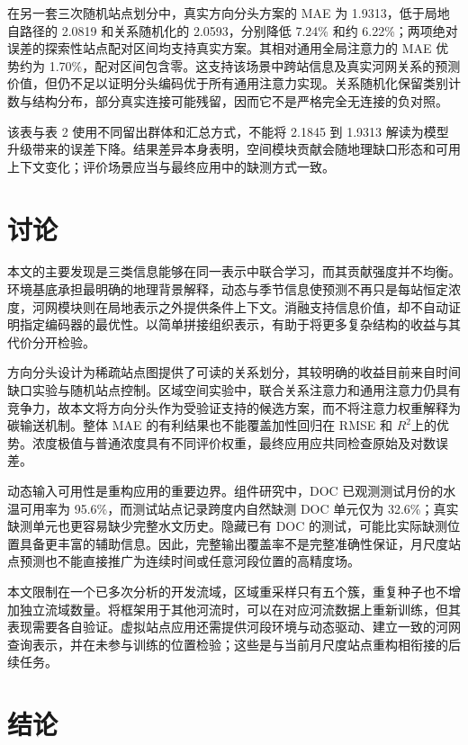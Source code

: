 \documentclass[UTF8,11pt,a4paper,fontset=none]{ctexart}
\begin{document}
在另一套三次随机站点划分中，真实方向分头方案的 MAE 为 1.9313，低于局地自路径的 2.0819 和关系随机化的 2.0593，分别降低 7.24\% 和约 6.22\%；两项绝对误差的探索性站点配对区间均支持真实方案。其相对通用全局注意力的 MAE 优势约为 1.70\%，配对区间包含零。这支持该场景中跨站信息及真实河网关系的预测价值，但仍不足以证明分头编码优于所有通用注意力实现。关系随机化保留类别计数与结构分布，部分真实连接可能残留，因而它不是严格完全无连接的负对照。


该表与表 2 使用不同留出群体和汇总方式，不能将 2.1845 到 1.9313 解读为模型升级带来的误差下降。结果差异本身表明，空间模块贡献会随地理缺口形态和可用上下文变化；评价场景应当与最终应用中的缺测方式一致。


\section{讨论}

本文的主要发现是三类信息能够在同一表示中联合学习，而其贡献强度并不均衡。环境基底承担最明确的地理背景解释，动态与季节信息使预测不再只是每站恒定浓度，河网模块则在局地表示之外提供条件上下文。消融支持信息价值，却不自动证明指定编码器的最优性。以简单拼接组织表示，有助于将更多复杂结构的收益与其代价分开检验。


方向分头设计为稀疏站点图提供了可读的关系划分，其较明确的收益目前来自时间缺口实验与随机站点控制。区域空间实验中，联合关系注意力和通用注意力仍具有竞争力，故本文将方向分头作为受验证支持的候选方案，而不将注意力权重解释为碳输送机制。整体 MAE 的有利结果也不能覆盖加性回归在 RMSE 和 $R^2$上的优势。浓度极值与普通浓度具有不同评价权重，最终应用应共同检查原始及对数误差。


动态输入可用性是重构应用的重要边界。组件研究中，DOC 已观测测试月份的水温可用率为 95.6\%，而测试站点记录跨度内自然缺测 DOC 单元仅为 32.6\%；真实缺测单元也更容易缺少完整水文历史。隐藏已有 DOC 的测试，可能比实际缺测位置具备更丰富的辅助信息。因此，完整输出覆盖率不是完整准确性保证，月尺度站点预测也不能直接推广为连续时间或任意河段位置的高精度场。


本文限制在一个已多次分析的开发流域，区域重采样只有五个簇，重复种子也不增加独立流域数量。将框架用于其他河流时，可以在对应河流数据上重新训练，但其表现需要各自验证。虚拟站点应用还需提供河段环境与动态驱动、建立一致的河网查询表示，并在未参与训练的位置检验；这些是与当前月尺度站点重构相衔接的后续任务。


\section{结论}
\end{document}
